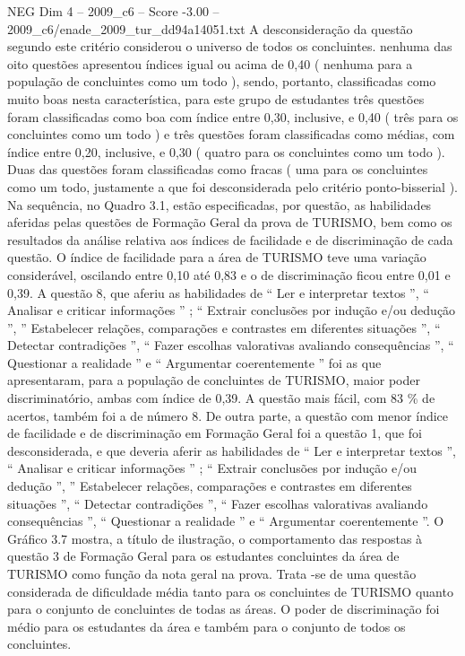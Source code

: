\begin{textsample}{NEG Dim 4 – 2009\_c6 – Score -3.00 – 2009\_c6/enade\_2009\_tur\_dd94a14051.txt}
A desconsideração da questão segundo este critério considerou o universo de todos os concluintes. nenhuma das oito questões apresentou índices igual ou acima de 0,40 ( nenhuma para a população de concluintes como um todo ), sendo, portanto, classificadas como muito boas nesta característica, para este grupo de estudantes três questões foram classificadas como boa com índice entre 0,30, inclusive, e 0,40 ( três para os concluintes como um todo ) e três questões foram classificadas como médias, com índice entre 0,20, inclusive, e 0,30 ( quatro para os concluintes como um todo ).
Duas das questões foram classificadas como fracas ( uma para os concluintes como um todo, justamente a que foi desconsiderada pelo critério ponto-bisserial ).
Na sequência, no Quadro 3.1, estão especificadas, por questão, as habilidades aferidas pelas questões de Formação Geral da prova de TURISMO, bem como os resultados da análise relativa aos índices de facilidade e de discriminação de cada questão.
O índice de facilidade para a área de TURISMO teve uma variação considerável, oscilando entre 0,10 até 0,83 e o de discriminação ficou entre 0,01 e 0,39.
A questão 8, que aferiu as habilidades de “ Ler e interpretar textos ”, “ Analisar e criticar informações ” ; “ Extrair conclusões por indução e/ou dedução ”, ” Estabelecer relações, comparações e contrastes em diferentes situações ”, “ Detectar contradições ”, “ Fazer escolhas valorativas avaliando consequências ”, “ Questionar a realidade ” e “ Argumentar coerentemente ” foi as que apresentaram, para a população de concluintes de TURISMO, maior poder discriminatório, ambas com índice de 0,39.
A questão mais fácil, com 83 \% de acertos, também foi a de número 8.
De outra parte, a questão com menor índice de facilidade e de discriminação em Formação Geral foi a questão 1, que foi desconsiderada, e que deveria aferir as habilidades de “ Ler e interpretar textos ”, “ Analisar e criticar informações ” ; “ Extrair conclusões por indução e/ou dedução ”, ” Estabelecer relações, comparações e contrastes em diferentes situações ”, “ Detectar contradições ”, “ Fazer escolhas valorativas avaliando consequências ”, “ Questionar a realidade ” e “ Argumentar coerentemente ”.
O Gráfico 3.7 mostra, a título de ilustração, o comportamento das respostas à questão 3 de Formação Geral para os estudantes concluintes da área de TURISMO como função da nota geral na prova.
Trata -se de uma questão considerada de dificuldade média tanto para os concluintes de TURISMO quanto para o conjunto de concluintes de todas as áreas.
O poder de discriminação foi médio para os estudantes da área e também para o conjunto de todos os concluintes.

\end{textsample}
